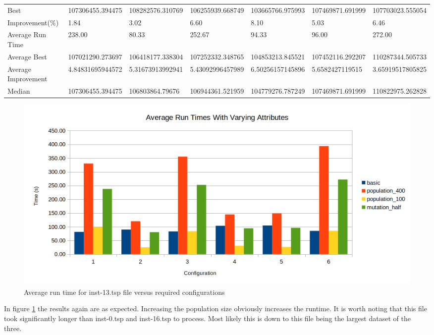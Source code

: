 \begin{table}[H]
{\begin{tabular}{lllllll}
\cellcolor[HTML]{ECF4FF}Best                & 107306455.394475 & 108282576.310769 & 106255939.668749 & 103665766.975993 & 107469871.691999 & 107703023.555054 \\
\cellcolor[HTML]{ECF4FF}Improvement(\%)     & 1.84             & 3.02             & 6.60             & 8.10             & 5.03             & 6.46             \\
\rowcolor[HTML]{CBCEFB} 
\cellcolor[HTML]{DAE8FC}Average Run Time    & 238.00           & 80.33            & 252.67           & 94.33            & 96.00            & 272.00           \\
\rowcolor[HTML]{CBCEFB} 
\cellcolor[HTML]{DAE8FC}Average Best        & 107021290.273697 & 106418177.338304 & 107252332.348765 & 104853213.845521 & 107452116.292207 & 110287344.505733 \\
\rowcolor[HTML]{CBCEFB} 
\cellcolor[HTML]{DAE8FC}Average Improvement & 4.84831695944572 & 5.31673913992941 & 5.43092996457989 & 6.50256157145896 & 5.6582427119515  & 3.65919517805825 \\
\rowcolor[HTML]{CBCEFB} 
\cellcolor[HTML]{DAE8FC}Median              & 107306455.394475 & 106803864.79676  & 106944361.521959 & 104779276.787249 & 107469871.691999 & 110822975.262828
\end{tabular}%
}
\end{table}

\begin{figure}[H]
\vspace{-5pt}
\centering
\includegraphics[width=1.0\textwidth]{images/inst-13-run-time.png}
\caption{\label{fig:inst-13-run-time}Average run time for inst-13.tsp file versus required configurations}
\end{figure}

In figure \ref{fig:inst-13-run-time} the results again are as expected. Increasing the population size obviously increases the runtime. It is worth noting that this file took significantly longer than inst-0.tsp and inst-16.tsp to process. Most likely this is down to this file being the largest dataset of the three.

